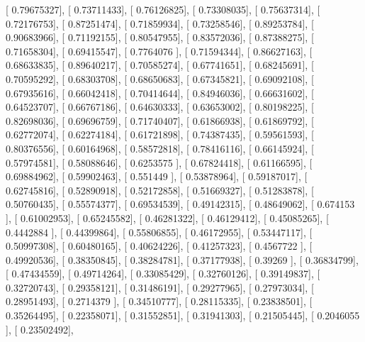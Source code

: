 \documentclass{article}
\begin{document}
       [ 0.79675327],
       [ 0.73711433],
       [ 0.76126825],
       [ 0.73308035],
       [ 0.75637314],
       [ 0.72176753],
       [ 0.87251474],
       [ 0.71859934],
       [ 0.73258546],
       [ 0.89253784],
       [ 0.90683966],
       [ 0.71192155],
       [ 0.80547955],
       [ 0.83572036],
       [ 0.87388275],
       [ 0.71658304],
       [ 0.69415547],
       [ 0.7764076 ],
       [ 0.71594344],
       [ 0.86627163],
       [ 0.68633835],
       [ 0.89640217],
       [ 0.70585274],
       [ 0.67741651],
       [ 0.68245691],
       [ 0.70595292],
       [ 0.68303708],
       [ 0.68650683],
       [ 0.67345821],
       [ 0.69092108],
       [ 0.67935616],
       [ 0.66042418],
       [ 0.70414644],
       [ 0.84946036],
       [ 0.66631602],
       [ 0.64523707],
       [ 0.66767186],
       [ 0.64630333],
       [ 0.63653002],
       [ 0.80198225],
       [ 0.82698036],
       [ 0.69696759],
       [ 0.71740407],
       [ 0.61866938],
       [ 0.61869792],
       [ 0.62772074],
       [ 0.62274184],
       [ 0.61721898],
       [ 0.74387435],
       [ 0.59561593],
       [ 0.80376556],
       [ 0.60164968],
       [ 0.58572818],
       [ 0.78416116],
       [ 0.66145924],
       [ 0.57974581],
       [ 0.58088646],
       [ 0.6253575 ],
       [ 0.67824418],
       [ 0.61166595],
       [ 0.69884962],
       [ 0.59902463],
       [ 0.551449  ],
       [ 0.53878964],
       [ 0.59187017],
       [ 0.62745816],
       [ 0.52890918],
       [ 0.52172858],
       [ 0.51669327],
       [ 0.51283878],
       [ 0.50760435],
       [ 0.55574377],
       [ 0.69534539],
       [ 0.49142315],
       [ 0.48649062],
       [ 0.674153  ],
       [ 0.61002953],
       [ 0.65245582],
       [ 0.46281322],
       [ 0.46129412],
       [ 0.45085265],
       [ 0.4442884 ],
       [ 0.44399864],
       [ 0.55806855],
       [ 0.46172955],
       [ 0.53447117],
       [ 0.50997308],
       [ 0.60480165],
       [ 0.40624226],
       [ 0.41257323],
       [ 0.4567722 ],
       [ 0.49920536],
       [ 0.38350845],
       [ 0.38284781],
       [ 0.37177938],
       [ 0.39269   ],
       [ 0.36834799],
       [ 0.47434559],
       [ 0.49714264],
       [ 0.33085429],
       [ 0.32760126],
       [ 0.39149837],
       [ 0.32720743],
       [ 0.29358121],
       [ 0.31486191],
       [ 0.29277965],
       [ 0.27973034],
       [ 0.28951493],
       [ 0.2714379 ],
       [ 0.34510777],
       [ 0.28115335],
       [ 0.23838501],
       [ 0.35264495],
       [ 0.22358071],
       [ 0.31552851],
       [ 0.31941303],
       [ 0.21505445],
       [ 0.2046055 ],
       [ 0.23502492],
\end{document}
